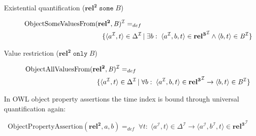 \documentclass{ao2e}
\newcommand{\mirel}[1]{\ensuremath{\mathrm{\mathbf{#1}}}}
\newcommand{\mclass}[1]{\ensuremath{\mathit{#1}}}
\newcommand{\mrel}[2]{\mirel{#1^#2}}
\newcommand{\mrelb}[1]{\mrel{#1}{2}}
\newcommand{\mrelt}[1]{\mrel{#1}{3}}
\newcommand{\dlint}[1]{\ensuremath{#1^{\mathcal{I}}}}
\newcommand{\pair}[2]{\ensuremath{\langle #1,#2\rangle}}
\begin{document}
\begin{description}
\item[Existential quantification ($\mrelb{rel}\;\mathtt{some}\;\mclass{B}$)]
\begin{equation}
\begin{split}
\dlint{\text{ObjectSomeValuesFrom}&(\mrelb{rel},\mclass{B})} =_{def}\\ &\quad
\{\pair{\dlint{a}}{t}\in \dlint{\Delta}\,|\; \exists b:\;\langle\dlint{a},b,t\rangle
\in \dlint{\mrelt{rel}} \wedge \pair{b}{t} \in \dlint{\mclass{B}}\}
\end{split}
\end{equation} 
\item[Value restriction ($\mrelb{rel}\;\mathtt{only}\;\mclass{B}$)]
\begin{equation}
\begin{split}
\dlint{\text{ObjectAllValuesFrom}&(\mrelb{rel},\mclass{B})} =_{def}\\ &\quad
\{\pair{\dlint{a}}{t}\in \dlint{\Delta}\,|\; \forall b:\;\langle\dlint{a},b,t\rangle
\in \dlint{\mrelt{rel}} \rightarrow \pair{b}{t} \in \dlint{\mclass{B}}\}
\end{split}
\end{equation}
\end{description}

In OWL object property assertions the time index is bound through universal
quantification again:

\begin{equation}
\text{ObjectPropertyAssertion}(\mrelb{rel},a,b) =_{def}\;\forall
t:\;\pair{\dlint{a}}{t} \in \dlint{\Delta} \rightarrow \langle
\dlint{a},\dlint{b},t\rangle \in \dlint{\mrelt{rel}}
\end{equation}
\end{document}
